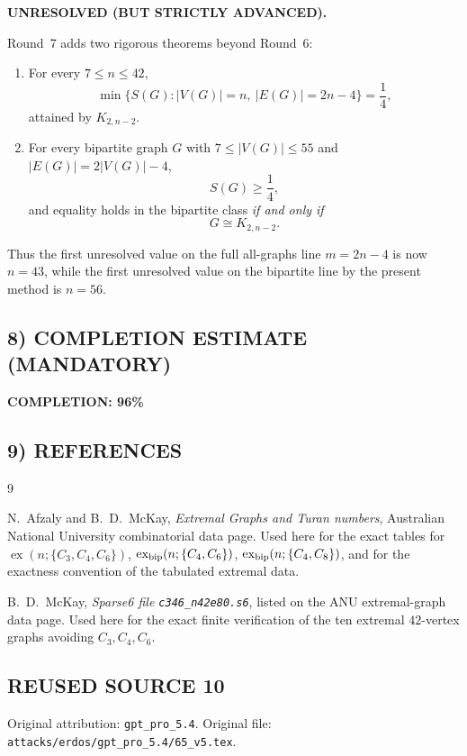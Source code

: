 \textbf{UNRESOLVED (BUT STRICTLY ADVANCED).}

Round~7 adds two rigorous theorems beyond Round~6:

\begin{enumerate}
\item For every $7\le n\le 42$,
\[
\min\{S(G): |V(G)|=n,\ |E(G)|=2n-4\}=\frac14,
\]
attained by $K_{2,n-2}$.

\item For every bipartite graph $G$ with $7\le |V(G)|\le 55$ and $|E(G)|=2|V(G)|-4$,
\[
S(G)\ge \frac14,
\]
and equality holds in the bipartite class \emph{if and only if}
\[
G\cong K_{2,n-2}.
\]
\end{enumerate}

Thus the first unresolved value on the full all-graphs line $m=2n-4$ is now $n=43$, while the first unresolved value on the bipartite line by the present method is $n=56$.

\subsection*{8) COMPLETION ESTIMATE (MANDATORY)}

\textbf{COMPLETION: 96\%}

\subsection*{9) REFERENCES}

\begin{thebibliography}{9}

N.~Afzaly and B.~D.~McKay,
\emph{Extremal Graphs and Turan numbers},
Australian National University combinatorial data page.
Used here for the exact tables for
$\operatorname{ex}(n;\{C_3,C_4,C_6\})$,
$\operatorname{ex}_{\rm bip}(n;\{C_4,C_6\})$,
$\operatorname{ex}_{\rm bip}(n;\{C_4,C_8\})$,
and for the exactness convention of the tabulated extremal data.

B.~D.~McKay,
\emph{Sparse6 file \texttt{c346\_n42e80.s6}},
listed on the ANU extremal-graph data page.
Used here for the exact finite verification of the ten extremal $42$-vertex graphs avoiding $C_3,C_4,C_6$.

\end{thebibliography}


\subsection*{REUSED SOURCE 10}
Original attribution: \texttt{gpt\_pro\_5.4}.
Original file: \texttt{attacks/erdos/gpt\_pro\_5.4/65\_v5.tex}.

